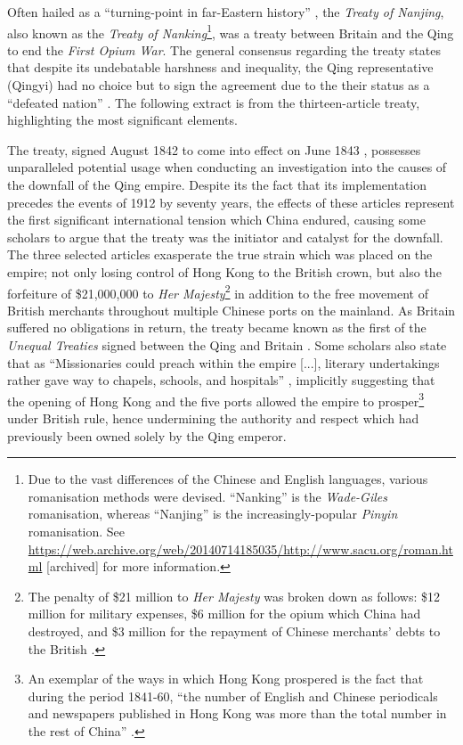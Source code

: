 \documentclass{article}
\begin{document}
Often hailed as a ``turning-point in far-Eastern history''
\autocite{Fairbank:1940}, the \textit{Treaty of Nanjing}, also known as the \textit{Treaty of Nanking}\footnote{Due to the vast differences of the Chinese and English languages, various romanisation methods were devised. ``Nanking'' is the \textit{Wade-Giles} romanisation, whereas ``Nanjing'' is the increasingly-popular \textit{Pinyin} romanisation. See \url{https://web.archive.org/web/20140714185035/http://www.sacu.org/roman.html} [archived] for more information.}, was a treaty between Britain and the Qing to end the \textit{First Opium War}. The general consensus regarding the treaty states that despite its undebatable harshness and inequality, the Qing representative (Qingyi) had no choice but to sign the agreement due to the their status as a ``defeated nation''
\autocite{Mao:2018}. The following extract is from the thirteen-article treaty, highlighting the most significant elements.


The treaty, signed  August 1842 to come into effect on  June 1843
\autocite{Saw:1975}, possesses unparalleled potential usage when conducting an investigation into the causes of the downfall of the Qing empire. Despite its the fact that its implementation precedes the events of 1912 by seventy years, the effects of these articles represent the first significant international tension which China endured, causing some scholars to argue that the treaty was the initiator and catalyst for the downfall. The three selected articles exasperate the true strain which was placed on the empire; not only losing control of Hong Kong to the British crown, but also the forfeiture of \$21,000,000 to \textit{Her Majesty}\footnote{The penalty of \$21 million to \textit{Her Majesty} was broken down as follows: \$12 million for military expenses, \$6 million for the opium which China had destroyed, and \$3 million for the repayment of Chinese merchants' debts to the British
\autocite{Hsu:1999}.} in addition to the free movement of British merchants throughout multiple Chinese ports on the mainland. As Britain suffered no obligations in return, the treaty became known as the first of the \textit{Unequal Treaties} signed between the Qing and Britain
\autocite{Hoe:1999}. Some scholars also state that as ``Missionaries could preach within the empire [...], literary undertakings rather gave way to chapels, schools, and hospitals''
\autocite{Britton:1933}, implicitly suggesting that the opening of Hong Kong and the five ports allowed the empire to prosper\footnote{An exemplar of the ways in which Hong Kong prospered is the fact that during the period 1841-60, ``the number of English and Chinese periodicals and newspapers published in Hong Kong was more than the total number in the rest of China''
\autocite{Huang:2001}.} under British rule, hence undermining the authority and respect which had previously been owned solely by the Qing emperor.
\end{document}
